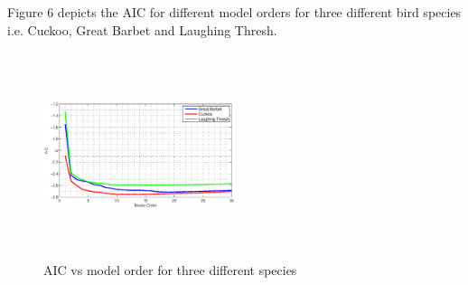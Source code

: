 \documentclass[a4paper]{article}
\begin{document}
 
 
Figure 6 depicts the AIC for different model orders for three different bird species i.e. Cuckoo, Great Barbet and Laughing Thresh. 

 \begin{figure}[!ht]
	\centering
	\includegraphics[width=0.5\textwidth,height=6cm] {AIC_species3.eps}
	\caption{AIC vs model order for three different species }   
\end{figure} 


 
 
 
\end{document}
